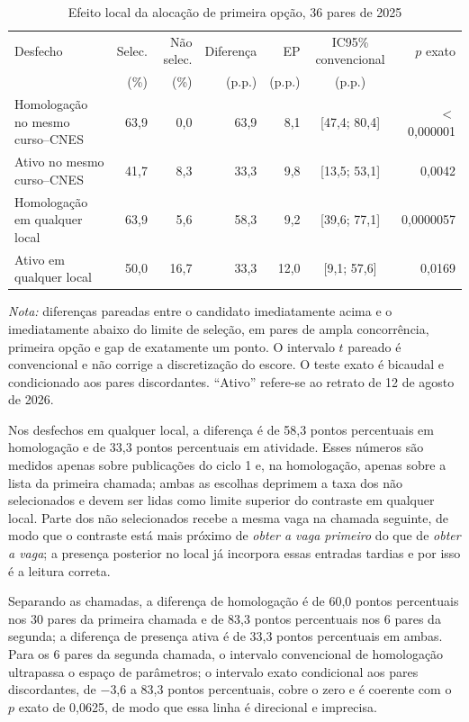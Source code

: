 \documentclass[11pt,a4paper]{article}
\begin{document}
\begin{table}[htbp]
\centering
\footnotesize
\setlength{\tabcolsep}{4pt}
\caption{Efeito local da alocação de primeira opção, 36 pares de 2025}
\label{tab:principal}
\begin{tabular}{lrrrrcr}
\toprule
Desfecho & Selec. & Não selec. & Diferença & EP & IC95\% convencional & $p$ exato \\
 & (\%) & (\%) & (p.p.) & (p.p.) & (p.p.) & \\
\midrule
Homologação no mesmo curso--CNES & 63,9 & 0,0 & 63,9 & 8,1 & [47,4; 80,4] & $<$0,000001 \\
Ativo no mesmo curso--CNES & 41,7 & 8,3 & 33,3 & 9,8 & [13,5; 53,1] & 0,0042 \\
Homologação em qualquer local & 63,9 & 5,6 & 58,3 & 9,2 & [39,6; 77,1] & 0,0000057 \\
Ativo em qualquer local & 50,0 & 16,7 & 33,3 & 12,0 & [9,1; 57,6] & 0,0169 \\
\bottomrule
\end{tabular}

\vspace{2pt}
\begin{minipage}{0.94\textwidth}
\footnotesize \textit{Nota:} diferenças pareadas entre o candidato imediatamente
acima e o imediatamente abaixo do limite de seleção, em pares de ampla
concorrência, primeira opção e gap de exatamente um ponto. O intervalo $t$
pareado é convencional e não corrige a discretização do escore. O teste exato é
bicaudal e condicionado aos pares discordantes. ``Ativo'' refere-se ao retrato
de 12 de agosto de 2026.
\end{minipage}
\end{table}

Nos desfechos em qualquer local, a diferença é de 58,3 pontos percentuais em
homologação e de 33,3 pontos percentuais em atividade. Esses números são
medidos apenas sobre publicações do ciclo 1 e, na homologação, apenas sobre a
lista da primeira chamada; ambas as escolhas deprimem a taxa dos não
selecionados e devem ser lidas como limite superior do contraste em qualquer
local. Parte dos não selecionados recebe a mesma vaga na chamada seguinte, de
modo que o contraste está mais próximo de \emph{obter a vaga primeiro} do que
de \emph{obter a vaga}; a presença posterior no local já incorpora essas
entradas tardias e por isso é a leitura correta.

Separando as chamadas, a diferença de homologação é de 60,0 pontos percentuais
nos 30 pares da primeira chamada e de 83,3 pontos percentuais nos 6 pares da
segunda; a diferença de presença ativa é de 33,3 pontos percentuais em ambas.
Para os 6 pares da segunda chamada, o intervalo convencional de homologação
ultrapassa o espaço de parâmetros; o intervalo exato condicional aos pares
discordantes, de $-$3,6 a 83,3 pontos percentuais, cobre o zero e é coerente
com o $p$ exato de 0,0625, de modo que essa linha é direcional e imprecisa.
\end{document}
